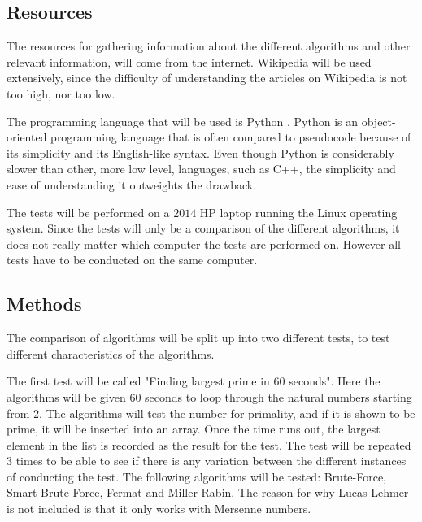 \documentclass[main.tex]{subfiles}
\begin{document}
\subsection{Resources}
The resources for gathering information about the different algorithms and other
relevant information, will come from the internet. Wikipedia \cite{wikipedia}
will be used extensively, since the difficulty of understanding the articles on
Wikipedia is not too high, nor too low. \newline

The programming language that will be used is Python \cite{python}. Python is an
object-oriented programming language that is often compared to pseudocode
because of its simplicity and its English-like syntax. Even though Python is
considerably slower \cite{pythonvscpp} than other, more low level, languages, such as C++\cite{cpp},
the simplicity and ease of understanding it outweights the drawback. \newline

The tests will be performed on a $2014$ HP laptop running the Linux operating
system. Since the tests will only be a comparison of the different algorithms,
it does not really matter which computer the tests are performed on. However all
tests have to be conducted on the same computer.

\subsection{Methods}
The comparison of algorithms will be split up into two different tests, to test
different characteristics of the algorithms. \newline

The first test will be called "Finding largest prime in $60$ seconds". Here the
algorithms will be given $60$ seconds to loop through the natural numbers
starting from $2$. The algorithms will test the number for primality, and if it
is shown to be prime, it will be inserted into an array. Once the time runs out,
the largest element in the list is recorded as the result for the test. The test
will be repeated $3$ times to be able to see if there is any variation between
the different instances of conducting the test. The following algorithms will be tested: Brute-Force, Smart
Brute-Force, Fermat and Miller-Rabin. The reason for why Lucas-Lehmer is not
included is that it only works with Mersenne numbers. \newline
\end{document}

